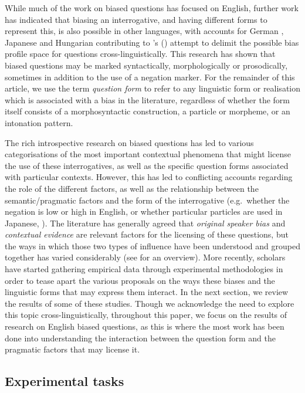 \documentclass[output=paper,colorlinks,citecolor=brown]{langscibook}
\begin{document}
While much of the work on biased questions has focused on English, further work has indicated that biasing an interrogative, and having different forms to represent this, is also possible in other languages, with accounts for German \citep{buring_arent1_2000}, Japanese \citep{sudo_biased_2013} and Hungarian \citep{gyuris_new_2016} contributing to \citeauthor{gaertner_delimiting_2017}'s (\citeyear{gaertner_delimiting_2017}) attempt to delimit the possible bias profile space for questions cross-linguistically. This research has shown that biased questions may be marked syntactically, morphologically or prosodically, sometimes in addition to the use of a negation marker. For the remainder of this article, we use the term \textit{question form} to refer to any linguistic form or realisation which is associated with a bias in the literature, regardless of whether the form itself consists of a morphosyntactic construction, a particle or morpheme, or an intonation pattern. 

The rich introspective research on biased questions has led to various categorisations of the most important contextual phenomena that might license the use of these interrogatives, as well as the specific question forms associated with particular contexts. However, this has led to conflicting accounts regarding the role of the different factors, as well as the relationship between the semantic/pragmatic factors and the form of the interrogative (e.g.\ whether the negation is low or high in English, or whether particular particles are used in Japanese, \citealt{sudo_biased_2013}). The literature has generally agreed that \textit{original speaker bias} and \textit{contextual evidence} are relevant factors for the licensing of these questions, but the ways in which those two types of influence have been understood and grouped together has varied considerably (see \citealt{romero_form_2020} for an overview). More recently, scholars have started gathering empirical data through experimental methodologies in order to tease apart the various proposals on the ways these biases and the linguistic forms that may express them interact. In the next section, we review the results of some of these studies. Though we acknowledge the need to explore this topic cross-linguistically, throughout this paper, we focus on the results of research on English biased questions, as this is where the most work has been done into understanding the interaction between the question form and the pragmatic factors that may license it.

\subsection{Experimental tasks}\label{exptasks}
\end{document}
